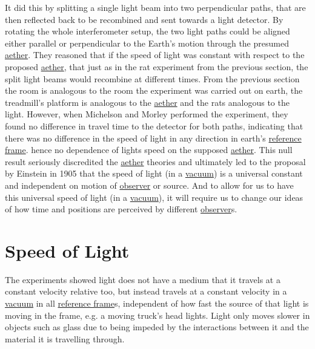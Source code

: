 It did this by splitting a single light beam into two perpendicular paths, that are then reflected back to be recombined and sent towards a light detector. By rotating the whole interferometer setup, the two light paths could be aligned either parallel or perpendicular to the Earth’s motion through the presumed \hyperlink{def-aether}{aether}.
They reasoned that if the speed of light was constant with respect to the proposed \hyperlink{def-aether}{aether}, that just as in the rat experiment from the previous section, the split light beams would recombine at different times. From the previous section the room is analogous to the room the experiment was carried out on earth, the treadmill's platform is analogous to the \hyperlink{def-aether}{aether} and the rats analogous to the light.
However, when Michelson and Morley performed the experiment, they found no difference in travel time to the detector for both paths, indicating that there was no difference in the speed of light in any direction in earth's \hyperlink{def-Reference-frame}{reference frame}. hence no dependence of lights speed on the supposed \hyperlink{def-aether}{aether}. This null result seriously discredited the \hyperlink{def-aether}{aether} theories and ultimately led to the proposal by Einstein in 1905 that the speed of light (in a \hyperlink{def-vacuum}{vacuum}) is a universal constant and independent on motion of \hyperlink{def-observer}{observer} or source. And to allow for us to have this universal speed of light (in a \hyperlink{def-vacuum}{vacuum}), it will require us to change our ideas of how time and positions are perceived by different \hyperlink{def-observer}{observer}s.



\section{Speed of Light}%

The experiments showed light does not have a medium that it travels at a constant velocity relative too, but instead travels at a constant velocity in a \hyperlink{def-vacuum}{vacuum} in all \hyperlink{def-Reference-frame}{reference frame}s, independent of how fast the source of that light is moving in the frame, e.g. a moving truck's head lights. Light only moves slower in objects such as glass due to being impeded by the interactions between it and the material it is travelling through.

